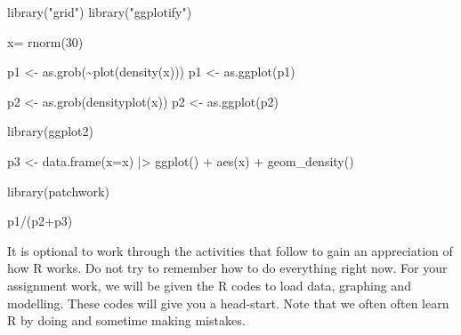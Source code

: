\documentclass[
  letterpaper,
  DIV=11,
  numbers=noendperiod]{scrreprt}
\newenvironment{Shaded}{\begin{snugshade}}{\end{snugshade}}
\newcommand{\AttributeTok}[1]{\textcolor[rgb]{0.40,0.45,0.13}{#1}}
\newcommand{\DecValTok}[1]{\textcolor[rgb]{0.68,0.00,0.00}{#1}}
\newcommand{\FunctionTok}[1]{\textcolor[rgb]{0.28,0.35,0.67}{#1}}
\newcommand{\NormalTok}[1]{\textcolor[rgb]{0.00,0.23,0.31}{#1}}
\newcommand{\OtherTok}[1]{\textcolor[rgb]{0.00,0.23,0.31}{#1}}
\newcommand{\SpecialCharTok}[1]{\textcolor[rgb]{0.37,0.37,0.37}{#1}}
\newcommand{\StringTok}[1]{\textcolor[rgb]{0.13,0.47,0.30}{#1}}
\begin{document}
\begin{Shaded}
\begin{Highlighting}[]
\FunctionTok{library}\NormalTok{(}\StringTok{"grid"}\NormalTok{)}
\FunctionTok{library}\NormalTok{(}\StringTok{"ggplotify"}\NormalTok{)}

\NormalTok{x}\OtherTok{=} \FunctionTok{rnorm}\NormalTok{(}\DecValTok{30}\NormalTok{)}

\NormalTok{p1 }\OtherTok{\textless{}{-}} \FunctionTok{as.grob}\NormalTok{(}\SpecialCharTok{\textasciitilde{}}\FunctionTok{plot}\NormalTok{(}\FunctionTok{density}\NormalTok{(x)))}
\NormalTok{p1 }\OtherTok{\textless{}{-}} \FunctionTok{as.ggplot}\NormalTok{(p1)}

\NormalTok{p2 }\OtherTok{\textless{}{-}} \FunctionTok{as.grob}\NormalTok{(}\FunctionTok{densityplot}\NormalTok{(x))}
\NormalTok{p2 }\OtherTok{\textless{}{-}} \FunctionTok{as.ggplot}\NormalTok{(p2)}

\FunctionTok{library}\NormalTok{(ggplot2)}

\NormalTok{p3 }\OtherTok{\textless{}{-}} \FunctionTok{data.frame}\NormalTok{(}\AttributeTok{x=}\NormalTok{x) }\SpecialCharTok{|\textgreater{}} 
  \FunctionTok{ggplot}\NormalTok{() }\SpecialCharTok{+} 
  \FunctionTok{aes}\NormalTok{(x) }\SpecialCharTok{+}
  \FunctionTok{geom\_density}\NormalTok{()}

\FunctionTok{library}\NormalTok{(patchwork)}

\NormalTok{p1}\SpecialCharTok{/}\NormalTok{(p2}\SpecialCharTok{+}\NormalTok{p3)}
\end{Highlighting}
\end{Shaded}

\begin{tcolorbox}[enhanced jigsaw, colback=white, colframe=quarto-callout-tip-color-frame, breakable, rightrule=.15mm, title=\textcolor{quarto-callout-tip-color}{\faLightbulb}\hspace{0.5em}{Tip}, coltitle=black, titlerule=0mm, colbacktitle=quarto-callout-tip-color!10!white, leftrule=.75mm, bottomtitle=1mm, arc=.35mm, opacityback=0, toprule=.15mm, toptitle=1mm, opacitybacktitle=0.6, bottomrule=.15mm, left=2mm]

It is optional to work through the activities that follow to gain an
appreciation of how R works. Do not try to remember how to do everything
right now. For your assignment work, we will be given the R codes to
load data, graphing and modelling. These codes will give you a
head-start. Note that we often often learn R by doing and sometime
making mistakes.

\end{tcolorbox}
\end{document}
